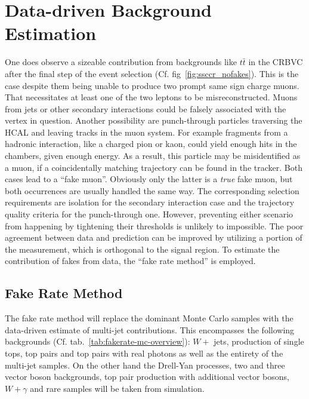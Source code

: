\chapter{Data-driven Background Estimation}
\label{cha:datadrivenbg}

One does observe a sizeable contribution from backgrounds like $t\bar{t}$ in the CRBVC after the final step of the event selection (Cf. fig~\ref{fig:ssccr_nofakes}). This is the case despite them being unable to produce two prompt same sign charge muons. That necessitates at least one of the two leptons to be misreconstructed. Muons from jets or other secondary interactions could be falsely associated with the vertex in question. Another possibility are punch-through particles traversing the HCAL and leaving tracks in the muon system. For example fragments from a hadronic interaction, like a charged pion or kaon, could yield enough hits in the chambers, given enough energy. As a result, this particle may be misidentified as a muon, if a coincidentally matching trajectory can be found in the tracker. Both cases lead to a ``fake muon''. Obviously only the latter is a \textit{true} fake muon, but both occurrences are usually handled the same way. The corresponding selection requirements are isolation for the secondary interaction case and the trajectory quality criteria for the punch-through one. However, preventing either scenario from happening by tightening their thresholds is unlikely to impossible. The poor agreement between data and prediction can be improved by utilizing a portion of the measurement, which is orthogonal to the signal region. To estimate the contribution of fakes from data, the ``fake rate method'' is employed.


\section{Fake Rate Method}
\label{sec:fakerate}

The fake rate method will replace the dominant Monte Carlo samples with the data-driven estimate of multi-jet contributions. This encompasses the following backgrounds (Cf. tab.~\ref{tab:fakerate-mc-overview}): $W +$ jets, production of single tops, top pairs and top pairs with real photons as well as the entirety of the multi-jet samples. On the other hand the Drell-Yan processes, two and three vector boson backgrounds, top pair production with additional vector bosons, $W + \gamma$ and rare samples will be taken from simulation.

